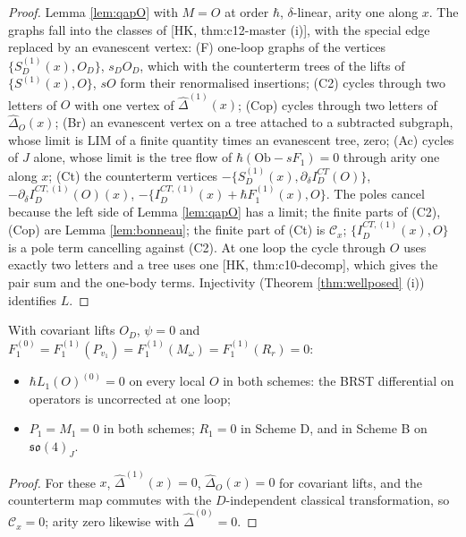 \begin{proof}
Lemma \ref{lem:qapO} with $M=O$ at order $\hbar$, $\delta$-linear, arity one along $x$. The graphs fall into the classes of [HK, thm:c12-master (i)], with the special edge replaced by an evanescent vertex: (F) one-loop graphs of the vertices $\{S^{(1)}_D(x),O_D\}$, $s_DO_D$, which with the counterterm trees of the lifts of $\{S^{(1)}(x),O\}$, $sO$ form their renormalised insertions; (C2) cycles through two letters of $O$ with one vertex of $\widehat\Delta^{(1)}(x)$; (Cop) cycles through two letters of $\widehat\Delta_O(x)$; (Br) an evanescent vertex on a tree attached to a subtracted subgraph, whose limit is $\mathrm{LIM}$ of a finite quantity times an evanescent tree, zero; (Ac) cycles of $J$ alone, whose limit is the tree flow of $\hbar(\mathrm{Ob}-sF_1)=0$ through arity one along $x$; (Ct) the counterterm vertices $-\{S^{(1)}_D(x),\partial_\delta I^{CT}_D(O)\}$, $-\partial_\delta I^{CT,(1)}_D(O)(x)$, $-\{I^{CT,(1)}_D(x)+\hbar F_1^{(1)}(x),O\}$. The poles cancel because the left side of Lemma \ref{lem:qapO} has a limit; the finite parts of (C2), (Cop) are Lemma \ref{lem:bonneau}; the finite part of (Ct) is $\mathcal C_x$; $\{I^{CT,(1)}_D(x),O\}$ is a pole term cancelling against (C2). At one loop the cycle through $O$ uses exactly two letters and a tree uses one [HK, thm:c10-decomp], which gives the pair sum and the one-body terms. Injectivity (Theorem \ref{thm:wellposed} (i)) identifies $L$.
\end{proof}

\begin{corollary}
\label{cor:exact}
With covariant lifts $O_D$, $\psi=0$ and $F^{(0)}_1=F^{(1)}_1(P_{v_1})=F^{(1)}_1(M_\omega)=F^{(1)}_1(R_r)=0$:
\begin{itemize}
\item $\hbar L_1(O)^{(0)}=0$ on every local $O$ in both schemes: the BRST differential on operators is uncorrected at one loop;
\item $P_1=M_1=0$ in both schemes; $R_1=0$ in Scheme D, and in Scheme B on $\mathfrak{so}(4)_J$.
\end{itemize}
\end{corollary}

\begin{proof}
For these $x$, $\widehat\Delta^{(1)}(x)=0$, $\widehat\Delta_O(x)=0$ for covariant lifts, and the counterterm map commutes with the $D$-independent classical transformation, so $\mathcal C_x=0$; arity zero likewise with $\widehat\Delta^{(0)}=0$.
\end{proof}

